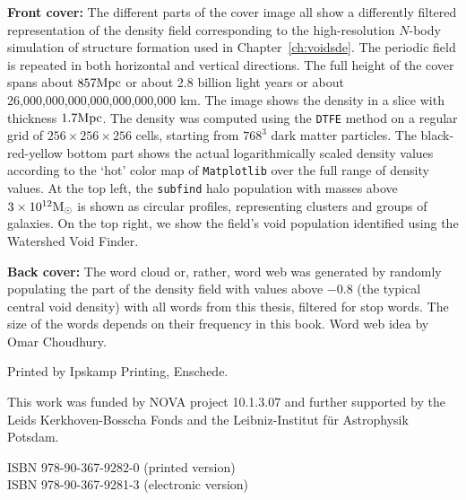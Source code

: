 \textbf{Front cover:}
The different parts of the cover image all show a differently filtered representation of the density field corresponding to the high-resolution $N$-body simulation of structure formation used in Chapter~\ref{ch:voidsde}.
The periodic field is repeated in both horizontal and vertical directions.
The full height of the cover spans about $857\mathrm{Mpc}$ or about 2.8 billion light years or about 26,000,000,000,000,000,000,000 km.
The image shows the density in a slice with thickness $1.7\mathrm{Mpc}$.
The density was computed using the \texttt{DTFE} method on a regular grid of $256 \times 256 \times 256$ cells, starting from $768^3$ dark matter particles.
The black-red-yellow bottom part shows the actual logarithmically scaled density values according to the `hot' color map of \texttt{Matplotlib} over the full range of density values.
At the top left, the \texttt{subfind} halo population with masses above $3\times10^{12} \mbox{${\rm M}_{\odot}$}$ is shown as circular profiles, representing clusters and groups of galaxies.
On the top right, we show the field's void population identified using the Watershed Void Finder.

\textbf{Back cover:}
The word cloud or, rather, word web was generated by randomly populating the part of the density field with values above $-0.8$ (the typical central void density) with all words from this thesis, filtered for stop words.
The size of the words depends on their frequency in this book.
Word web idea by Omar Choudhury.

Printed by Ipskamp Printing, Enschede.

This work was funded by NOVA project 10.1.3.07 and further supported by the Leids Kerkhoven-Bosscha Fonds and the Leibniz-Institut f\"{u}r Astrophysik Potsdam.

ISBN 978-90-367-9282-0 (printed version) \\
ISBN 978-90-367-9281-3 (electronic version)

\pagebreak

